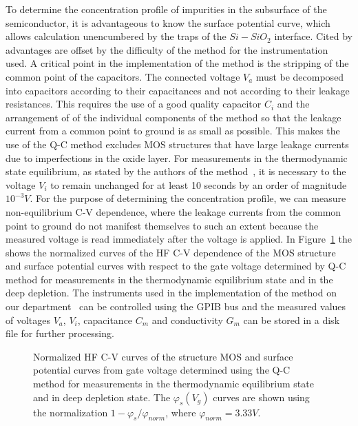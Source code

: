 To determine the concentration profile of impurities in the subsurface
of the semiconductor, it is advantageous to know the surface potential
curve, which allows calculation unencumbered by the traps of the
$Si-SiO_2$ interface. Cited by advantages are offset by the difficulty
of the method for the instrumentation used.  A critical point in the
implementation of the method is the stripping of the common point of
the capacitors. The connected voltage $V_a$ must be decomposed into
capacitors according to their capacitances and not according to their
leakage resistances.  This requires the use of a good quality
capacitor $C_i$ and the arrangement of of the individual components of
the method so that the leakage current from a common point to ground
is as small as possible. This makes the use of the Q-C method excludes
MOS structures that have large leakage currents due to imperfections
in the oxide layer. For measurements in the thermodynamic state
equilibrium, as stated by the authors of the method~\cite{3.7}, it is
necessary to the voltage $V_i$ to remain unchanged for at least 10
seconds by an order of magnitude $10^{-3}V$. For the purpose of
determining the concentration profile, we can measure non-equilibrium
C-V dependence, where the leakage currents from the common point to
ground do not manifest themselves to such an extent because the
measured voltage is read immediately after the voltage is applied. In
Figure~\ref{fig:3.2} the shows the normalized curves of the HF C-V
dependence of the MOS structure and surface potential curves with
respect to the gate voltage determined by Q-C method for measurements
in the thermodynamic equilibrium state and in the deep depletion. The
instruments used in the implementation of the method on our
department~\cite{3.8,3.9} can be controlled using the GPIB bus and
the measured values of voltages $V_a$, $V_i$, capacitance $C_m$ and
conductivity $G_m$ can be stored in a disk file for further
processing.

\begin{figure}[h!]\centering
  
  \caption[Normalized curves HF C-V dependence of MOS structure and
    curve surface potential versus gate voltage determined using the
    Q-C method for measurements in thermodynamic equilibrium and deep
    depletion]{Normalized HF C-V curves of the structure MOS and
    surface potential curves from gate voltage determined using the
    Q-C method for measurements in the thermodynamic equilibrium state
    and in deep depletion state. The $\varphi_s(V_g)$ curves are shown
    using the normalization $1-{\varphi_s}/{\varphi_{norm}}$,
    where $\varphi_{norm}=3.33V$.}\label{fig:3.2}
\end{figure}

